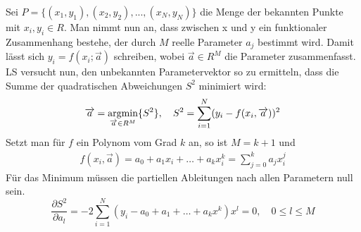 Sei $P = \{(x_1, y_1), (x_2, y_2), ..., (x_N, y_N)\}$ die Menge der bekannten Punkte mit $x_i, y_i \in R$. Man nimmt nun an, dass zwischen x und y ein funktionaler Zusammenhang bestehe, der durch $M$ reelle Parameter $a_j$ bestimmt wird. Damit lässt sich $y_i = f(x_i; \overrightarrow{a})$ schreiben, wobei $\overrightarrow{a} \in R^M$ die Parameter zusammenfasst. LS versucht nun, den unbekannten Parametervektor so zu ermitteln, dass die Summe der quadratischen Abweichungen $S^2$ minimiert wird:
\begin{equation}
\begin{split}
\overrightarrow{a} = \mathop{\mathrm{argmin}}_{\overrightarrow{a} \in R^M} \{ S^2 \}, \quad
S^2 =  \sum_{i=1}^{N} (y_i - f(x_i, \overrightarrow{a}))^2
\end{split}
\label{eq:opt}
\end{equation}
Setzt man für $f$ ein Polynom vom Grad $k$ an, so ist $M = k+1$ und
\begin{gather}
f(x_i, \overrightarrow{a}) = a_0 + a_1 x_i + \dots + a_k x_i^k = \sum_{j = 0}^{k} a_j x_i^j %
\end{gather}
Für das Minimum müssen die partiellen Ableitungen nach allen Parametern null sein.
\begin{equation}
\frac{\partial S^2}{\partial a_l} = -2 \sum_{i=1}^{N}(y_i - a_0 + a_1 + \dots + a_k x^k) x^l = 0, \quad 0 \leq l \leq M
\end{equation}
